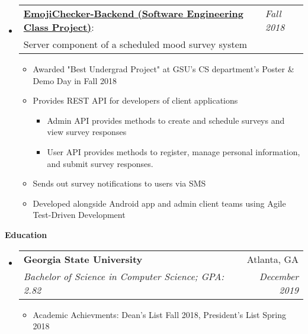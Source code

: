 \documentclass[letterpaper,11pt]{article}
\makeatletter
\newcommand{\resitem}[1]{\item #1 \vspace{-2pt}}
\newcommand{\resheading}[1]{{\large \colorbox{mygrey}{\begin{minipage}{\textwidth}{\textbf{#1 \vphantom{p\^{E}}}}\end{minipage}}}}
\newcommand{\ressubheading}[4]{
\begin{tabular*}{6.5in}{l@{\extracolsep{\fill}}r}
    \textbf{#1} & #2 \\
    \textit{#3} & \textit{#4} \\
\end{tabular*}\vspace{-6pt}}
\newcommand{\projectheading}[3]{
\begin{tabular*}{6.5in}{l@{\extracolsep{\fill}}l}
\textbf{#1}: & \textit{#3}\\
\footnotesize{#2} 
\end{tabular*}
\vspace{-6pt}
}
\makeatother
\begin{document}
\begin{itemize}[leftmargin=*]
        \item[]{\projectheading{\href{https://github.com/slogsdon7/EmojiChecker-Backend}{EmojiChecker-Backend (Software Engineering Class Project)}}{Server component of a scheduled mood survey system}{Fall 2018}
        { \footnotesize{
        \begin{itemize}
            \resitem {Awarded "Best Undergrad Project" at GSU's CS department's Poster \& Demo Day in Fall 2018}
            \resitem {Provides REST API for developers of client applications}
            \begin{itemize}
                \item Admin API provides methods to create and schedule surveys and view survey responses
                \item User API provides methods to register, manage personal information, and submit survey responses.
            \end{itemize}
            \resitem {Sends out survey notifications to users via SMS}
            \resitem {Developed alongside Android app and admin client teams using Agile Test-Driven Development}
        \end{itemize}}
        }
        }
        \begin{comment}
        \item[] {\projectheading
        {\href{https://github.com/slogsdon7/RGBGridSequencer}{Java RGBGridSequencer}}
        {GUI for design and playback of grid-based RGB sequences}{Nov 2018}
        \footnotesize{
        \begin{itemize}
            \resitem {Optionally supports playback of sequences on a Novation Launchpad hardware device}
            \resitem {Sequences stored in a sqlite database}
        \end{itemize}
        }
        }
        \end{comment}
        
    \end{itemize}
    \resheading{Education}
    \begin{itemize}[leftmargin=*]
        \item[]
        \ressubheading{Georgia State University}{Atlanta, GA}{Bachelor of Science in Computer Science; GPA: 2.82}{December 2019}
        {\footnotesize
        \begin{itemize}
            \resitem{Academic Achievments: Dean's List Fall 2018, President's List Spring 2018}
        \end{itemize}
        }

    \end{itemize}
\end{document}
